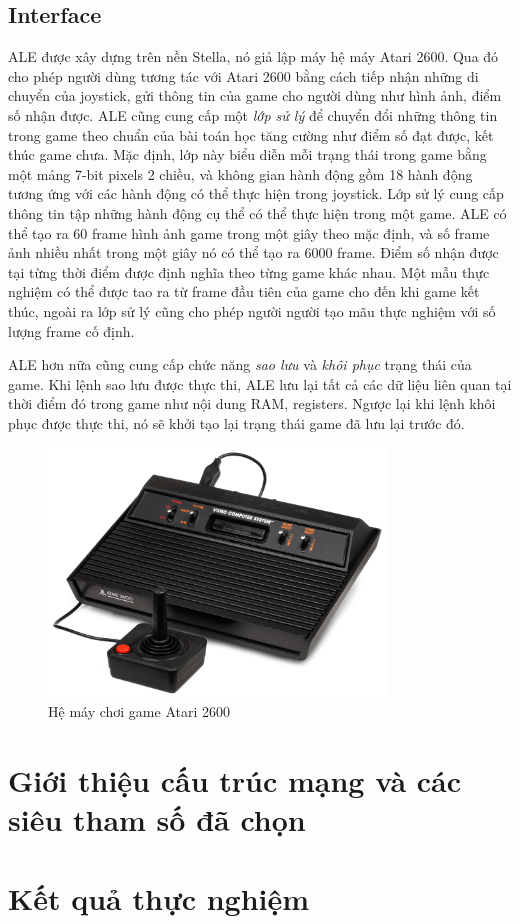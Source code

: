 \subsection{Interface}
ALE được xây dựng trên nền Stella, nó giả lập máy hệ máy Atari 2600. Qua đó cho phép người dùng tương tác với Atari 2600 bằng cách tiếp nhận những di chuyển của joystick, gửi thông tin của game cho người dùng như hình ảnh, điểm số nhận được. ALE cũng cung cấp một \textit{lớp sử lý} để chuyển đổi những thông tin trong game theo chuẩn của bài toán học tăng cường như điểm số đạt được, kết thúc game chưa. Mặc định, lớp này biểu diễn mỗi trạng thái trong game bằng một mảng 7-bit pixels 2 chiều, và không gian hành động gồm 18 hành động tương ứng với các hành động có thể thực hiện trong joystick. Lớp sử lý cung cấp thông tin tập những hành động cụ thể có thể thực hiện trong một game. ALE có thể tạo ra 60 frame hình ảnh game trong một giây theo mặc định, và số frame ảnh nhiều nhất trong một giây nó có thể tạo ra 6000 frame. Điểm số nhận được tại từng thời điểm được định nghĩa theo từng game khác nhau. Một mẫu thực nghiệm có thể được tao ra từ frame đầu tiên của game cho đến khi game kết thúc, ngoài ra lớp sử lý cũng cho phép người người tạo mãu thực nghiệm với số lượng frame cố định.

ALE hơn nữa cũng cung cấp chức năng \textit{sao lưu} và \textit{khôi phục} trạng thái của game. Khi lệnh sao lưu được thực thi, ALE lưu lại tất cả các dữ liệu liên quan tại thời điểm đó trong game như nội dung RAM, registers. Ngược lại khi lệnh khôi phục được thực thi, nó sẽ khởi tạo lại trạng thái game đã lưu lại trước đó.

\begin{figure}
	\centering
	\includegraphics[width=90mm]{Atari2600Console.jpg}
	\caption{Hệ máy chơi game Atari 2600}
	\label{fig:AtariConsole}
\end{figure}

\section{Giới thiệu cấu trúc mạng và các siêu tham số đã chọn}
\section{Kết quả thực nghiệm}